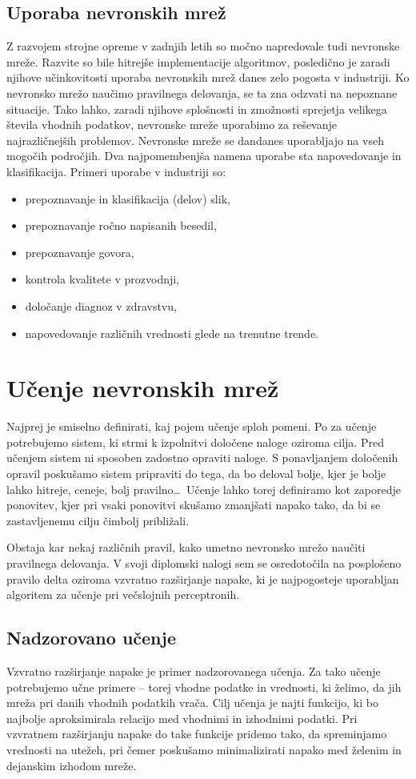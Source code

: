 \documentclass[mat1]{fmfdelo}
\begin{document}
\subsection{Uporaba nevronskih mrež}
Z razvojem strojne opreme v zadnjih letih so močno napredovale tudi nevronske mreže. Razvite so bile hitrejše implementacije algoritmov, posledično je zaradi njihove učinkovitosti uporaba nevronskih mrež danes zelo pogosta v industriji. Ko nevronsko mrežo naučimo pravilnega delovanja, se ta zna odzvati na nepoznane situacije. Tako lahko, zaradi njihove splošnosti in zmožnosti sprejetja velikega števila vhodnih podatkov, nevronske mreže uporabimo za reševanje najrazličnejših problemov. Nevronske mreže se dandanes uporabljajo na vseh mogočih področjih. Dva najpomembenjša namena uporabe sta napovedovanje in klasifikacija. Primeri uporabe v industriji so: 
\begin{itemize}
\item prepoznavanje in klasifikacija (delov) slik,
\item prepoznavanje ročno napisanih besedil,
\item prepoznavanje govora,
\item kontrola kvalitete v prozvodnji,
\item določanje diagnoz v zdravstvu,
\item napovedovanje različnih vrednosti glede na trenutne trende.
\end{itemize}
%
\section{Učenje nevronskih mrež}
Najprej je smiselno definirati, kaj pojem učenje sploh pomeni. Po \cite[str.~37]{kononenko} za učenje potrebujemo sistem, ki strmi k izpolnitvi določene naloge oziroma cilja. Pred učenjem sistem ni sposoben zadostno opraviti naloge. S ponavljanjem določenih opravil poskušamo sistem pripraviti do tega, da bo deloval bolje, kjer je bolje lahko hitreje, ceneje, bolj pravilno\ldots\ Učenje lahko torej definiramo kot zaporedje ponovitev, kjer pri vsaki ponovitvi skušamo zmanjšati napako tako, da bi se zastavljenemu cilju čimbolj približali. 

Obstaja kar nekaj različnih pravil, kako umetno nevronsko mrežo naučiti pravilnega delovanja. V svoji diplomski nalogi sem se osredotočila na posplošeno pravilo delta oziroma vzvratno razširjanje napake, ki je najpogosteje uporabljan algoritem za učenje pri večslojnih perceptronih. 
%
\subsection{Nadzorovano učenje}
Vzvratno razširjanje napake je primer nadzorovanega učenja. Za tako učenje potrebujemo učne primere -- torej vhodne podatke in vrednosti, ki želimo, da jih mreža pri danih vhodnih podatkih vrača. Cilj učenja je najti funkcijo, ki bo najbolje aproksimirala relacijo med vhodnimi in izhodnimi podatki. Pri vzvratnem razširjanju napake do take funkcije pridemo tako, da spreminjamo vrednosti na utežeh, pri čemer poskušamo minimalizirati napako med želenim in dejanskim izhodom mreže.
\end{document}
